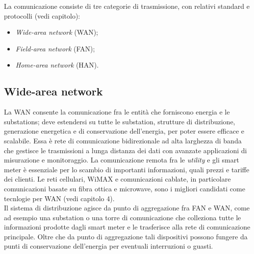 
La comunicazione consiste di tre categorie di trasmissione, con relativi standard e protocolli (vedi capitolo):
\begin{itemize}
	\item \emph{Wide-area network} (WAN);
	\item \emph{Field-area network} (FAN);
	\item \emph{Home-area network} (HAN).
\end{itemize}

\subsection{Wide-area network}
La WAN consente la comunicazione fra le entità che forniscono energia e le substations; deve estendersi su tutte le substation, strutture di distribuzione, generazione energetica e di conservazione dell'energia, per poter essere efficace e scalabile. Essa è rete di comunicazione bidirezionale ad alta larghezza di banda che gestisce le trasmissioni a lunga distanza dei dati con avanzate applicazioni di misurazione e monitoraggio. La comunicazione remota fra le \emph{utility} e gli smart meter è essenziale per lo scambio di importanti informazioni, quali prezzi e tariffe dei clienti. Le reti cellulari, WiMAX e comunicazioni cablate, in particolare comunicazioni basate su fibra ottica e microwave, sono i migliori candidati come tecnlogie per WAN (vedi capitolo 4).
\\
Il sistema di distribuzione agisce da punto di aggregazione fra FAN e WAN, come ad esempio una substation o una torre di comunicazione che colleziona tutte le informazioni prodotte dagli smart meter e le trasferisce alla rete di comunicazione principale. Oltre che da punto di aggregazione tali dispositivi possono fungere da punti di conservazione dell'energia per eventuali interruzioni o guasti.

